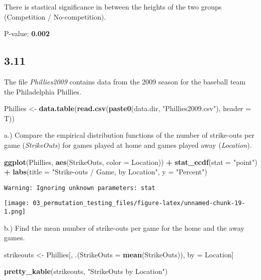 \documentclass[
  12pt,
]{report}
\newenvironment{Shaded}{\begin{snugshade}}{\end{snugshade}}
\newcommand{\DataTypeTok}[1]{\textcolor[rgb]{0.13,0.29,0.53}{#1}}
\newcommand{\KeywordTok}[1]{\textcolor[rgb]{0.13,0.29,0.53}{\textbf{#1}}}
\newcommand{\NormalTok}[1]{#1}
\newcommand{\OperatorTok}[1]{\textcolor[rgb]{0.81,0.36,0.00}{\textbf{#1}}}
\newcommand{\StringTok}[1]{\textcolor[rgb]{0.31,0.60,0.02}{#1}}
\begin{document}
There is stastical significance in between the heights of the two groups
(Competition / No-competition).

P-value: \textbf{0.002}

\hypertarget{section-10}{%
\subsection{3.11}\label{section-10}}

The file \emph{Phillies2009} contains data from the 2009 season for the
baseball team the Philadelphia Phillies.

\begin{Shaded}
\begin{Highlighting}[]
\NormalTok{Phillies <-}\StringTok{ }\KeywordTok{data.table}\NormalTok{(}\KeywordTok{read.csv}\NormalTok{(}\KeywordTok{paste0}\NormalTok{(data.dir, }\StringTok{"Phillies2009.csv"}\NormalTok{),}
                               \DataTypeTok{header =}\NormalTok{ T))}
\end{Highlighting}
\end{Shaded}

a.) Compare the empirical distribution functions of the number of
strike-outs per game (\emph{StrikeOuts}) for games played at home and
games played away (\emph{Location}).

\begin{Shaded}
\begin{Highlighting}[]
\KeywordTok{ggplot}\NormalTok{(Phillies, }\KeywordTok{aes}\NormalTok{(StrikeOuts, }\DataTypeTok{color =}\NormalTok{ Location)) }\OperatorTok{+}
\StringTok{   }\KeywordTok{stat_ecdf}\NormalTok{(}\DataTypeTok{stat =} \StringTok{"point"}\NormalTok{) }\OperatorTok{+}
\StringTok{   }\KeywordTok{labs}\NormalTok{(}\DataTypeTok{title =} \StringTok{"Strike-outs / Game, by Location"}\NormalTok{, }\DataTypeTok{y =} \StringTok{"Percent"}\NormalTok{)}
\end{Highlighting}
\end{Shaded}

\begin{verbatim}
Warning: Ignoring unknown parameters: stat
\end{verbatim}

\texttt{[image: 03\_permutation\_testing\_files/figure-latex/unnamed-chunk-19-1.png]}

b.) Find the mean number of strike-outs per game for the home and the
away games.

\begin{Shaded}
\begin{Highlighting}[]
\NormalTok{strikeouts <-}\StringTok{ }\NormalTok{Phillies[, .(}\DataTypeTok{StrikeOuts =} \KeywordTok{mean}\NormalTok{(StrikeOuts)), by =}\StringTok{ }\NormalTok{Location]}

\KeywordTok{pretty_kable}\NormalTok{(strikeouts, }\StringTok{"StrikeOuts by Location"}\NormalTok{)}
\end{Highlighting}
\end{Shaded}
\end{document}
